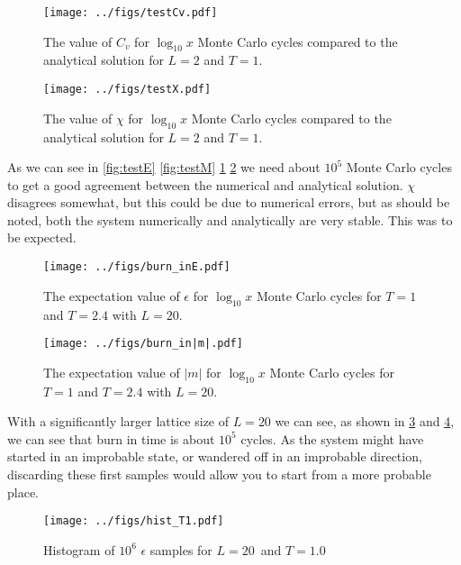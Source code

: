 \documentclass[english,notitlepage,reprint,nofootinbib]{revtex4-1}  %
\begin{document}
\begin{figure}[H]
	\centering
	\texttt{[image: ../figs/testCv.pdf]} %
	\caption{The value of $C_v$ for $\log_{10} x$ Monte Carlo cycles compared to the analytical solution for $L=2$ and $T=1$.}
	\label{fig:testCv}
\end{figure}

\begin{figure}[H]
	\centering
	\texttt{[image: ../figs/testX.pdf]} %
	\caption{The value of $\chi$ for $\log_{10} x$ Monte Carlo cycles compared to the analytical solution for $L=2$ and $T=1$.}
	\label{fig:testX}
\end{figure}

As we can see in \ref{fig:testE} \ref{fig:testM} \ref{fig:testCv} \ref{fig:testX} we need about $10^5$ Monte Carlo cycles to get a good agreement between the numerical and analytical solution. $\chi$ disagrees somewhat, but this could be due to numerical errors, but as should be noted, both the system numerically and analytically are very stable. This was to be expected.
\begin{figure}[H]
	\centering
	\texttt{[image: ../figs/burn\_inE.pdf]} %
	\caption{The expectation value of $\epsilon$ for $\log_{10} x$ Monte Carlo cycles for $T=1$ and $T=2.4$ with $L=20$.}
	\label{fig:burn_inE}
\end{figure}

\begin{figure}[H]
	\centering
	\texttt{[image: ../figs/burn\_in|m|.pdf]} %
	\caption{The expectation value of $|m|$ for $\log_{10} x$ Monte Carlo cycles for $T=1$ and $T=2.4$ with $L=20$.}
	\label{fig:burn_in|m|}
\end{figure}

With a significantly larger lattice size of $L=20$ we can see, as shown in \ref{fig:burn_inE} and \ref{fig:burn_in|m|}, we can see that burn in time is about $10^5$ cycles. As the system might have started in an improbable state, or wandered off in an improbable direction, discarding these first samples would allow you to start from a more probable place.

\begin{figure}[H]
	\centering
	\texttt{[image: ../figs/hist\_T1.pdf]} %
	\caption{Histogram of $10^6$ $\epsilon$ samples for $L=20$ and $T=1.0$}
	\label{fig:hist_T1}
\end{figure}
\end{document}
